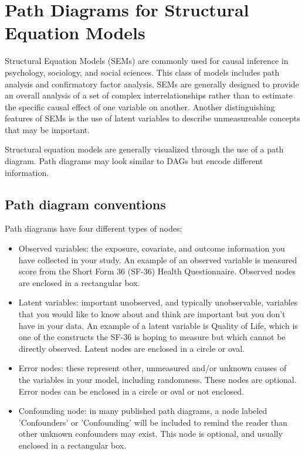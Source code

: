 \documentclass[a4paper]{report}
\begin{document}
\chapter{Path Diagrams for Structural Equation Models}
Structural Equation Models (SEMs) are commonly used for causal inference in psychology, sociology, and social sciences. This class of models includes path analysis and confirmatory factor analysis. SEMs are generally designed to provide an overall analysis of a set of complex interrelationships rather than to estimate the specific causal effect of one variable on another. Another distinguishing features of SEMs is the use of latent variables to describe unmeasureable concepts that may be important.

Structural equation models are generally visualized through the use of a path diagram. Path diagrams may look similar to DAGs but encode different information. 

\section{Path diagram conventions}

Path diagrams have four different types of nodes:
\begin{itemize}
    \item Observed variables: the exposure, covariate, and outcome information you have collected in your study. An example of an observed variable is measured score from the Short Form 36 (SF-36) Health Questionnaire. Observed nodes are enclosed in a rectangular box.
    \item Latent variables: important unobserved, and typically unobservable, variables that you would like to know about and think are important but you don't have in your data. An example of a latent variable is Quality of Life, which is one of the constructs the SF-36 is hoping to measure but which cannot be directly observed. Latent nodes are enclosed in a circle or oval.
    \item Error nodes: these represent other, unmeasured and/or unknown causes of the variables in your model, including randomness. These nodes are optional. Error nodes can be enclosed in a circle or oval or not enclosed.
    \item Confounding node: in many published path diagrams, a node labeled 'Confounders' or 'Confounding' will be included to remind the reader than other unknown confounders may exist. This node is optional, and usually enclosed in a rectangular box.
\end{itemize}
\end{document}
